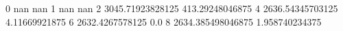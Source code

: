 0 nan nan
1 nan nan
2 3045.71923828125 413.29248046875
4 2636.54345703125 4.11669921875
6 2632.4267578125 0.0
8 2634.385498046875 1.958740234375
